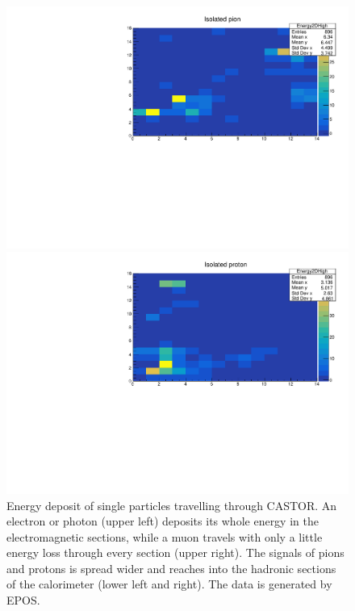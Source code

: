 \begin{figure}
\begin{minipage}[b]{0.95\textwidth}
\begin{minipage}{0.45\textwidth}
\includegraphics[width=\textwidth]{pionhist.pdf}
\end{minipage}
\begin{minipage}{0.45\textwidth}
\includegraphics[width=\textwidth]{protonhist.pdf}
\end{minipage}
\end{minipage}
\caption{Energy deposit of single particles travelling through CASTOR. An electron or photon (upper left) deposits its whole energy in the electromagnetic sections, while a muon travels with only a little energy loss through every section (upper right). The signals of pions and protons is spread wider and reaches into the hadronic sections of the calorimeter (lower left and right). The data is generated by EPOS.}
\label{signals}
\end{figure}

